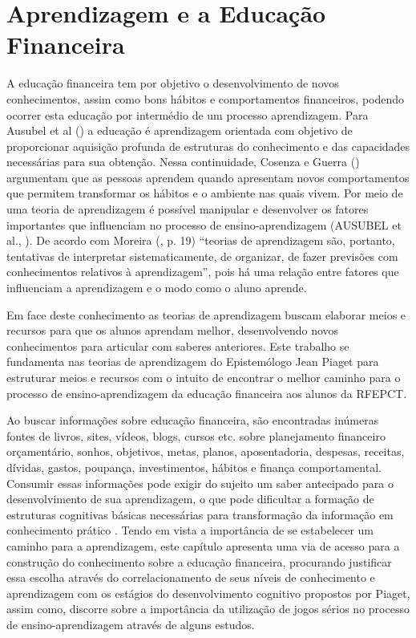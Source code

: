 \section{Aprendizagem e a Educação Financeira}
A educação financeira tem por objetivo o desenvolvimento de novos conhecimentos, assim como bons hábitos e comportamentos financeiros, podendo ocorrer esta educação por intermédio de um processo aprendizagem. Para Ausubel et al (\citeyear{ausubel1980}) a educação é aprendizagem orientada com objetivo de proporcionar aquisição profunda de estruturas do conhecimento e das capacidades necessárias para sua obtenção. Nessa continuidade, Cosenza e Guerra (\citeyear{cosenza2011}) argumentam que as pessoas aprendem quando apresentam novos comportamentos que permitem transformar os hábitos e o ambiente nas quais vivem. Por meio de uma teoria de aprendizagem é possível manipular e desenvolver os fatores importantes que influenciam no processo de ensino-aprendizagem (AUSUBEL et al., \citeyear{ausubel1980}). De acordo com Moreira (\citeyear{moreira2017}, p. 19) “teorias de aprendizagem são, portanto, tentativas de interpretar sistematicamente, de organizar, de fazer previsões com conhecimentos relativos à aprendizagem”, pois há uma relação entre fatores que influenciam a aprendizagem e o modo como o aluno aprende.

Em face deste conhecimento as teorias de aprendizagem buscam elaborar meios e recursos para que os alunos aprendam melhor, desenvolvendo novos conhecimentos para articular com saberes anteriores. Este trabalho se fundamenta nas teorias de aprendizagem do Epistemólogo Jean Piaget para estruturar meios e recursos com o intuito de encontrar o melhor caminho para o processo de ensino-aprendizagem da educação financeira aos alunos da RFEPCT.

Ao buscar informações sobre educação financeira, são encontradas inúmeras fontes de livros, sites, vídeos, blogs, cursos etc. sobre planejamento financeiro orçamentário, sonhos, objetivos, metas, planos, aposentadoria, despesas, receitas, dívidas, gastos, poupança, investimentos, hábitos e finança comportamental. Consumir essas informações pode exigir do sujeito um saber antecipado para o desenvolvimento de sua aprendizagem, o que pode dificultar a formação de estruturas cognitivas básicas necessárias para transformação da informação em conhecimento prático \cite{piaget2011}. Tendo em vista a importância de se estabelecer um caminho para a aprendizagem, este capítulo apresenta uma via de acesso para a construção do conhecimento sobre a educação financeira, procurando justificar essa escolha através do correlacionamento de seus níveis de conhecimento e aprendizagem com os estágios do desenvolvimento cognitivo propostos por Piaget, assim como, discorre sobre a importância da utilização de jogos sérios no processo de ensino-aprendizagem através de alguns estudos.

